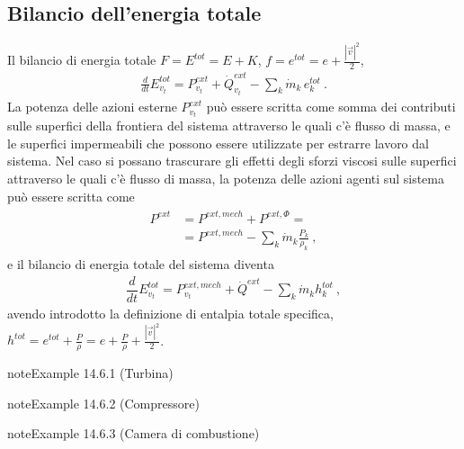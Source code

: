 \documentclass[letterpaper,10pt,italian]{jupyterBook}
\begin{document}
\subsection{Bilancio dell’energia totale}
\label{\detokenize{ch/thermodynamics/principles-open:bilancio-dell-energia-totale}}
\sphinxAtStartPar
Il bilancio di energia totale \(F = E^{tot} = E + K\), \(f = e^{tot} = e + \frac{|\vec{v}|^2}{2}\),
\begin{equation*}
\begin{split}\frac{d}{dt} E^{tot}_{v_t} = P^{ext}_{v_t}  + \dot{Q}^{ext}_{v_t}  - \sum_k \dot{m}_k \, e^{tot}_k \ .\end{split}
\end{equation*}
\sphinxAtStartPar
La potenza delle azioni esterne \(P^{ext}_{v_t}\) può essere scritta come somma dei contributi sulle superfici della frontiera del sistema attraverso le quali c’è flusso di massa, e le superfici impermeabili che possono essere utilizzate per estrarre lavoro dal sistema. Nel caso si possano trascurare gli effetti degli sforzi viscosi sulle superfici attraverso le quali c’è flusso di massa, la potenza delle azioni agenti sul sistema può essere scritta come
\begin{equation*}
\begin{split}\begin{aligned}
  P^{ext} & = P^{ext,mech} + P^{ext,\Phi} = \\
          & = P^{ext,mech} - \sum_{k} \dot{m}_k \frac{P_k}{\rho_k} \ , 
\end{aligned}\end{split}
\end{equation*}
\sphinxAtStartPar
e il bilancio di energia totale del sistema diventa
\begin{equation*}
\begin{split}\dfrac{d}{dt} E^{tot}_{v_t} = P^{ext,mech}_{v_t} + \dot{Q}^{ext} - \sum_k \dot{m}_k h^{tot}_k \ ,\end{split}
\end{equation*}
\sphinxAtStartPar
avendo introdotto la definizione di entalpia totale specifica, \(h^{tot} = e^{tot} + \frac{P}{\rho} = e + \frac{P}{\rho} + \frac{|\vec{v}|^2}{2}\).
\label{ch/thermodynamics/principles-open:thermodynamics:principles:open:ex:turbine}
\begin{sphinxadmonition}{note}{Example 14.6.1 (Turbina)}


\end{sphinxadmonition}
\label{ch/thermodynamics/principles-open:thermodynamics:principles:open:ex:compressor}
\begin{sphinxadmonition}{note}{Example 14.6.2 (Compressore)}


\end{sphinxadmonition}
\label{ch/thermodynamics/principles-open:thermodynamics:principles:open:ex:comb-chamber}
\begin{sphinxadmonition}{note}{Example 14.6.3 (Camera di combustione)}


\end{sphinxadmonition}
\end{document}
